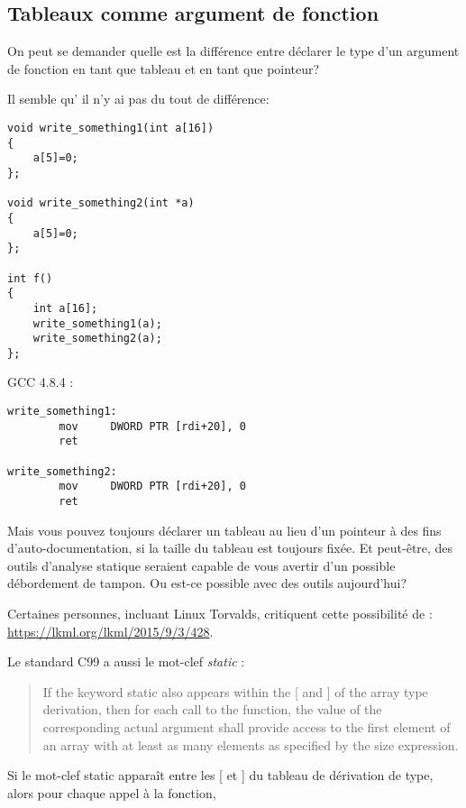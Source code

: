 \subsection{Tableaux comme argument de fonction}

On peut se demander quelle est la différence entre déclarer le type d'un argument
de fonction en tant que tableau et en tant que pointeur?

Il semble qu' il n'y ai pas du tout de différence:

\begin{lstlisting}[style=customc]
void write_something1(int a[16])
{
	a[5]=0;
};

void write_something2(int *a)
{
	a[5]=0;
};

int f()
{
	int a[16];
	write_something1(a);
	write_something2(a);
};
\end{lstlisting}

GCC 4.8.4 \Optimizing:

\begin{lstlisting}[style=customasmx86]
write_something1:
        mov     DWORD PTR [rdi+20], 0
        ret

write_something2:
        mov     DWORD PTR [rdi+20], 0
        ret
\end{lstlisting}

Mais vous pouvez toujours déclarer un tableau au lieu d'un pointeur à des fins d'auto-documentation,
si la taille du tableau est toujours fixée.
Et peut-être, des outils d'analyse statique seraient capable de vous avertir d'un
possible débordement de tampon.
Ou est-ce possible avec des outils aujourd'hui?

Certaines personnes, incluant Linux Torvalds, critiquent cette possibilité de \CCpp:
\url{https://lkml.org/lkml/2015/9/3/428}.

Le standard C99 a aussi le mot-clef \emph{static} :

\begin{framed}
\begin{quotation}
If the keyword static also appears  within the [ and ] of the array type derivation, then for each call to the function, the value of the corresponding actual argument shall provide access to the first element of an array with at least as many elements as specified by the size expression.
\end{quotation}
\end{framed}
Si le mot-clef static apparaît entre les [ et ] du tableau de dérivation de type, alors pour chaque appel à la fonction,


